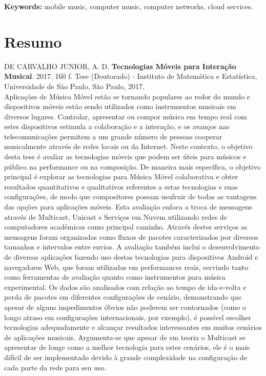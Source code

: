 \documentclass[11pt,twoside,a4paper]{book}
\begin{document}
	\noindent \textbf{Keywords:} mobile music, computer music, computer networks, cloud services.
	
	\chapter*{Resumo}
	
	\noindent DE CARVALHO JUNIOR, A. D. \textbf{Tecnologias Móveis para Interação Musical}. 
	2017. 160 f.
	Tese (Doutorado) - Instituto de Matemática e Estatística,
	Universidade de São Paulo, São Paulo, 2017.
	\\
	
	Aplicações de Música Móvel estão se tornando populares ao redor do mundo e dispositivos móveis estão sendo utilizados como instrumentos musicais em diversos lugares.
	Controlar, apresentar ou compor música em tempo real com estes dispositivos estimula a colaboração e a interação, e os avanços nas telecomunicações permitem a um grande número de pessoas cooperar musicalmente através de redes locais ou da Internet.
	Neste contexto, o objetivo desta tese é avaliar as tecnologias móveis que podem ser úteis para músicos e público na performance ou na composição.
	De maneira mais específica, o objetivo principal é explorar as tecnologias para Música Móvel colaborativa e obter resultados quantitativos e qualitativos referentes a estas tecnologias e suas configurações, de modo que compositores possam usufruir de todas as vantagens das opções para aplicações móveis.
	Esta avaliação enfoca a troca de mensagens através de Multicast, Unicast e Serviços em Nuvem utilizando redes de computadores acadêmicas como principal caminho.
	Através destes serviços as mensagens foram organizadas como fluxos de pacotes caracterizados por diversos tamanhos e intervalos entre envios.
	A avaliação também inclui o desenvolvimento de diversas aplicações fazendo uso destas tecnologias para dispositivos Android e navegadores Web, que foram utilizados em performances reais, servindo tanto como ferramentas de avaliação quanto como instrumentos para música experimental.
	Os dados são analisados com relação ao tempo de ida-e-volta e perda de pacotes em diferentes configurações de cenário, demonstrando que apesar de alguns impedimentos óbvios não poderem ser contornados (como o longo atraso em configurações internacionais, por exemplo), é possível escolher tecnologias adequadamente e alcançar resultados interessantes em muitos cenários de aplicações musicais.
	Argumenta-se que apesar de em teoria o Multicast se apresentar de longe como a melhor tecnologia para estes cenários, ele é o mais difícil de ser implementado devido à grande complexidade na configuração de cada parte da rede para seu uso.
\end{document}
